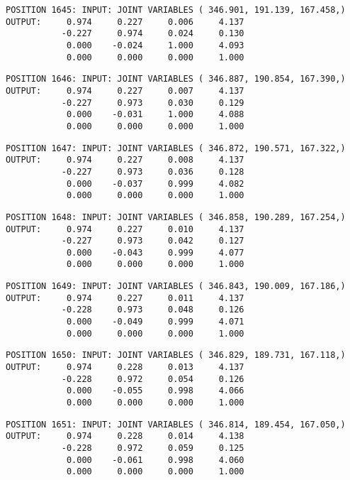 \begin{verbatim}
POSITION 1645: INPUT: JOINT VARIABLES ( 346.901, 191.139, 167.458,)
OUTPUT:     0.974     0.227     0.006     4.137
           -0.227     0.974     0.024     0.130
            0.000    -0.024     1.000     4.093
            0.000     0.000     0.000     1.000
\end{verbatim} \pagebreak[1]\begin{verbatim}
POSITION 1646: INPUT: JOINT VARIABLES ( 346.887, 190.854, 167.390,)
OUTPUT:     0.974     0.227     0.007     4.137
           -0.227     0.973     0.030     0.129
            0.000    -0.031     1.000     4.088
            0.000     0.000     0.000     1.000
\end{verbatim} \pagebreak[1]\begin{verbatim}
POSITION 1647: INPUT: JOINT VARIABLES ( 346.872, 190.571, 167.322,)
OUTPUT:     0.974     0.227     0.008     4.137
           -0.227     0.973     0.036     0.128
            0.000    -0.037     0.999     4.082
            0.000     0.000     0.000     1.000
\end{verbatim} \pagebreak[1]\begin{verbatim}
POSITION 1648: INPUT: JOINT VARIABLES ( 346.858, 190.289, 167.254,)
OUTPUT:     0.974     0.227     0.010     4.137
           -0.227     0.973     0.042     0.127
            0.000    -0.043     0.999     4.077
            0.000     0.000     0.000     1.000
\end{verbatim} \pagebreak[1]\begin{verbatim}
POSITION 1649: INPUT: JOINT VARIABLES ( 346.843, 190.009, 167.186,)
OUTPUT:     0.974     0.227     0.011     4.137
           -0.228     0.973     0.048     0.126
            0.000    -0.049     0.999     4.071
            0.000     0.000     0.000     1.000
\end{verbatim} \pagebreak[1]\begin{verbatim}
POSITION 1650: INPUT: JOINT VARIABLES ( 346.829, 189.731, 167.118,)
OUTPUT:     0.974     0.228     0.013     4.137
           -0.228     0.972     0.054     0.126
            0.000    -0.055     0.998     4.066
            0.000     0.000     0.000     1.000
\end{verbatim} \pagebreak[1]\begin{verbatim}
POSITION 1651: INPUT: JOINT VARIABLES ( 346.814, 189.454, 167.050,)
OUTPUT:     0.974     0.228     0.014     4.138
           -0.228     0.972     0.059     0.125
            0.000    -0.061     0.998     4.060
            0.000     0.000     0.000     1.000
\end{verbatim} \pagebreak[1]\begin{verbatim}

\end{verbatim}
